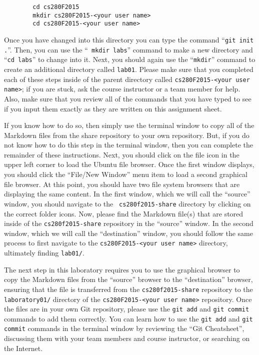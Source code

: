     \begin{verbatim}
        cd cs280F2015
        mkdir cs280F2015-<your user name>
        cd cs280F2015-<your user name>
    \end{verbatim}
    \vspace*{-.2in}


Once you have changed into this directory you can type the command ``{\tt git init .}''. Then, you can use the ``{\tt
mkdir labs}'' command to make a new directory and ``{\tt cd labs}'' to change into it.  Next, you should
again use the ``{\tt mkdir}'' command to create an additional directory called {\tt lab01}.  Please make sure that
you completed each of these steps inside of the parent directory called {\tt cs280F2015-<your user name>}; if you are
stuck, ask the course instructor or a team member for help. Also, make sure that you review all of the commands
that you have typed to see if you input them exactly as they are written on this assignment sheet.

If you know how to do so, then simply use the terminal window to copy all of the Markdown files from the share
repository to your own repository. But, if you do not know how to do this step in the terminal window, then you can
complete the remainder of these instructions. Next, you should click on the file icon in the upper left corner to load
the Ubuntu file browser.  Once the first window displays, you should click the ``File/New Window'' menu item to load a
second graphical file browser. At this point, you should have two file system browsers that are displaying the same
content.  In the first window, which we will call the ``source'' window, you should navigate to the {\tt
cs280f2015-share} directory by clicking on the correct folder icons.  Now, please find the Markdown file(s) that
are stored inside of the {\tt cs280f2015-share} repository in the ``source'' window. In the second window, which we will
call the ``destination'' window, you should follow the same process to first navigate to the {\tt cs280F2015-<your user
name>} directory, ultimately finding {\tt lab01/}.

The next step in this laboratory requires you to use the graphical browser to copy the Markdown files from the
``source'' browser to the ``destination'' browser, ensuring that the file is transferred from the {\tt cs280f2015-share}
repository to the {\tt laboratory01/} directory of the {\tt cs280F2015-<your user name>} repository.  Once the files are
in your own Git repository, please use the {\tt git add} and {\tt git commit} commands to add them correctly. You can
learn how to use the {\tt git add} and {\tt git commit} commands in the terminal window by reviewing the ``Git
Cheatsheet'', discussing them with your team members and course instructor, or searching on the Internet.

